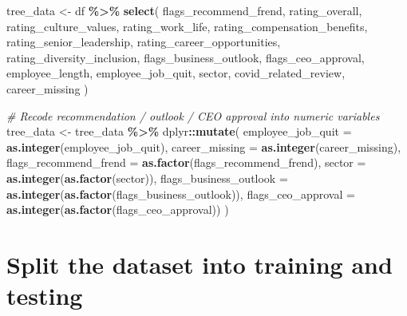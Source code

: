 \documentclass[
]{article}
\newenvironment{Shaded}{\begin{snugshade}}{\end{snugshade}}
\newcommand{\AttributeTok}[1]{\textcolor[rgb]{0.13,0.29,0.53}{#1}}
\newcommand{\CommentTok}[1]{\textcolor[rgb]{0.56,0.35,0.01}{\textit{#1}}}
\newcommand{\FunctionTok}[1]{\textcolor[rgb]{0.13,0.29,0.53}{\textbf{#1}}}
\newcommand{\NormalTok}[1]{#1}
\newcommand{\OtherTok}[1]{\textcolor[rgb]{0.56,0.35,0.01}{#1}}
\newcommand{\SpecialCharTok}[1]{\textcolor[rgb]{0.81,0.36,0.00}{\textbf{#1}}}
\begin{document}
\begin{Shaded}
\begin{Highlighting}[]
\NormalTok{tree\_data }\OtherTok{\textless{}{-}}\NormalTok{ df }\SpecialCharTok{\%\textgreater{}\%} 
  \FunctionTok{select}\NormalTok{( }
\NormalTok{    flags\_recommend\_frend, }
\NormalTok{    rating\_overall,}
\NormalTok{    rating\_culture\_values, }
\NormalTok{    rating\_work\_life, }
\NormalTok{    rating\_compensation\_benefits, }
\NormalTok{    rating\_senior\_leadership, }
\NormalTok{    rating\_career\_opportunities, }
\NormalTok{    rating\_diversity\_inclusion, }
\NormalTok{    flags\_business\_outlook, }
\NormalTok{    flags\_ceo\_approval,}
\NormalTok{    employee\_length, }
\NormalTok{    employee\_job\_quit, }
\NormalTok{    sector, }
\NormalTok{    covid\_related\_review, }
\NormalTok{    career\_missing}
\NormalTok{  )}

\CommentTok{\# Recode recommendation / outlook / CEO approval into numeric variables}
\NormalTok{tree\_data }\OtherTok{\textless{}{-}}\NormalTok{ tree\_data }\SpecialCharTok{\%\textgreater{}\%}
\NormalTok{  dplyr}\SpecialCharTok{::}\FunctionTok{mutate}\NormalTok{(}
    \AttributeTok{employee\_job\_quit =} \FunctionTok{as.integer}\NormalTok{(employee\_job\_quit),}
    \AttributeTok{career\_missing =} \FunctionTok{as.integer}\NormalTok{(career\_missing),}
    \AttributeTok{flags\_recommend\_frend =} \FunctionTok{as.factor}\NormalTok{(flags\_recommend\_frend),}
    \AttributeTok{sector =} \FunctionTok{as.integer}\NormalTok{(}\FunctionTok{as.factor}\NormalTok{(sector)),}
    \AttributeTok{flags\_business\_outlook =} \FunctionTok{as.integer}\NormalTok{(}\FunctionTok{as.factor}\NormalTok{(flags\_business\_outlook)),}
    \AttributeTok{flags\_ceo\_approval =} \FunctionTok{as.integer}\NormalTok{(}\FunctionTok{as.factor}\NormalTok{(flags\_ceo\_approval))}
\NormalTok{  )}
\end{Highlighting}
\end{Shaded}

\section{Split the dataset into training and
testing}\label{split-the-dataset-into-training-and-testing}
\end{document}
